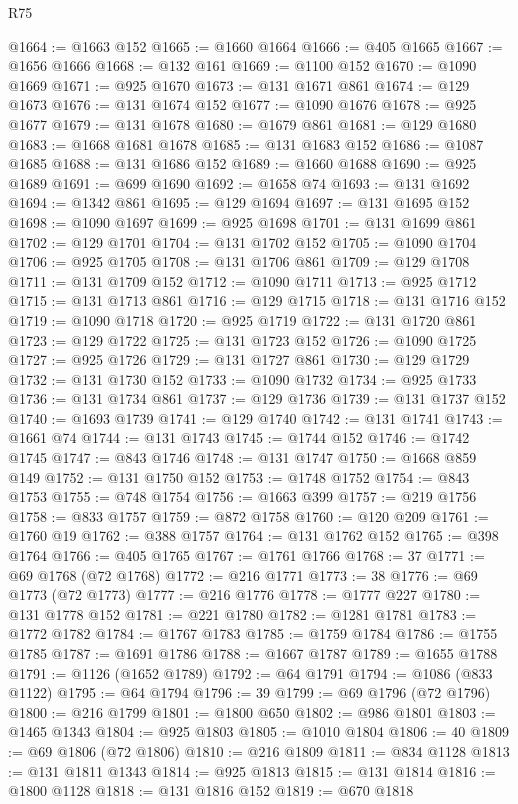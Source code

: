 \begin{lexlean}{R75}
\begin{coremodule}
@1664 := @1663 @152
@1665 := @1660 @1664
@1666 := @405 @1665
@1667 := @1656 @1666
@1668 := @132 @161
@1669 := @1100 @152
@1670 := @1090 @1669
@1671 := @925 @1670
@1673 := @131 @1671 @861
@1674 := @129 @1673
@1676 := @131 @1674 @152
@1677 := @1090 @1676
@1678 := @925 @1677
@1679 := @131 @1678
@1680 := @1679 @861
@1681 := @129 @1680
@1683 := @1668 @1681 @1678
@1685 := @131 @1683 @152
@1686 := @1087 @1685
@1688 := @131 @1686 @152
@1689 := @1660 @1688
@1690 := @925 @1689
@1691 := @699 @1690
@1692 := @1658 @74
@1693 := @131 @1692
@1694 := @1342 @861
@1695 := @129 @1694
@1697 := @131 @1695 @152
@1698 := @1090 @1697
@1699 := @925 @1698
@1701 := @131 @1699 @861
@1702 := @129 @1701
@1704 := @131 @1702 @152
@1705 := @1090 @1704
@1706 := @925 @1705
@1708 := @131 @1706 @861
@1709 := @129 @1708
@1711 := @131 @1709 @152
@1712 := @1090 @1711
@1713 := @925 @1712
@1715 := @131 @1713 @861
@1716 := @129 @1715
@1718 := @131 @1716 @152
@1719 := @1090 @1718
@1720 := @925 @1719
@1722 := @131 @1720 @861
@1723 := @129 @1722
@1725 := @131 @1723 @152
@1726 := @1090 @1725
@1727 := @925 @1726
@1729 := @131 @1727 @861
@1730 := @129 @1729
@1732 := @131 @1730 @152
@1733 := @1090 @1732
@1734 := @925 @1733
@1736 := @131 @1734 @861
@1737 := @129 @1736
@1739 := @131 @1737 @152
@1740 := @1693 @1739
@1741 := @129 @1740
@1742 := @131 @1741
@1743 := @1661 @74
@1744 := @131 @1743
@1745 := @1744 @152
@1746 := @1742 @1745
@1747 := @843 @1746
@1748 := @131 @1747
@1750 := @1668 @859 @149
@1752 := @131 @1750 @152
@1753 := @1748 @1752
@1754 := @843 @1753
@1755 := @748 @1754
@1756 := @1663 @399
@1757 := @219 @1756
@1758 := @833 @1757
@1759 := @872 @1758
@1760 := @120 @209
@1761 := @1760 @19
@1762 := @388 @1757
@1764 := @131 @1762 @152
@1765 := @398 @1764
@1766 := @405 @1765
@1767 := @1761 @1766
@1768 := 37
@1771 := @69 @1768 (@72 @1768)
@1772 := @216 @1771
@1773 := 38
@1776 := @69 @1773 (@72 @1773)
@1777 := @216 @1776
@1778 := @1777 @227
@1780 := @131 @1778 @152
@1781 := @221 @1780
@1782 := @1281 @1781
@1783 := @1772 @1782
@1784 := @1767 @1783
@1785 := @1759 @1784
@1786 := @1755 @1785
@1787 := @1691 @1786
@1788 := @1667 @1787
@1789 := @1655 @1788
@1791 := @1126 (@1652 @1789)
@1792 := @64 @1791
@1794 := @1086 (@833 @1122)
@1795 := @64 @1794
@1796 := 39
@1799 := @69 @1796 (@72 @1796)
@1800 := @216 @1799
@1801 := @1800 @650
@1802 := @986 @1801
@1803 := @1465 @1343
@1804 := @925 @1803
@1805 := @1010 @1804
@1806 := 40
@1809 := @69 @1806 (@72 @1806)
@1810 := @216 @1809
@1811 := @834 @1128
@1813 := @131 @1811 @1343
@1814 := @925 @1813
@1815 := @131 @1814
@1816 := @1800 @1128
@1818 := @131 @1816 @152
@1819 := @670 @1818

\end{coremodule}
\end{lexlean}
